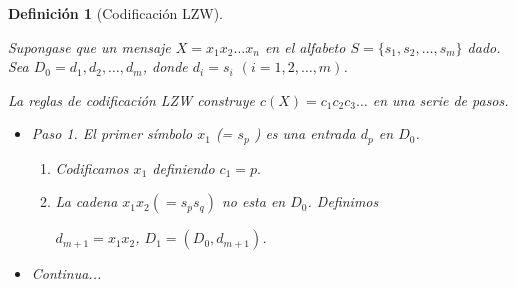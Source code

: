 \documentclass{beamer}
\theoremstyle{plain}
\newtheorem{definicion} [Definicion]{Definición}
\theoremstyle{example}
\theoremstyle{example}
\begin{document}
\begin{frame}  \small 

\begin{definicion} [Codificación LZW] \label{def:LZW}

Supongase que un mensaje $X = x_1 x_2 \ldots x_n$ en el alfabeto $S=\{s_1, s_2, \ldots, s_m\}$ dado. Sea $D_0= d_1, d_2, \ldots, d_m$, donde $d_i =s_i$  $(i = 1,2,\ldots,m)$. 

La reglas de codificación LZW construye $c(X ) = c_1 c_2 c_3 \ldots$ en una serie de pasos.

\begin{itemize}

\item  Paso 1.	El primer símbolo $x_1$ (= $s_p$ ) es una entrada $d_p$ en $D_0$. 

\begin{enumerate}
\item Codificamos $x_1$ definiendo $c_1 = p.$

\item La cadena $x_1x_2 (= s_p s_q )$ no esta en $D_0$. Definimos

\begin{center}
$d_{m+1} = x_1x_2$,	$D_1 = (D_0, d_{m+1})$.
\end{center}

\end{enumerate}


\item Continua...
\end{itemize}

\end{definicion}

\end{frame} 
\end{document}
